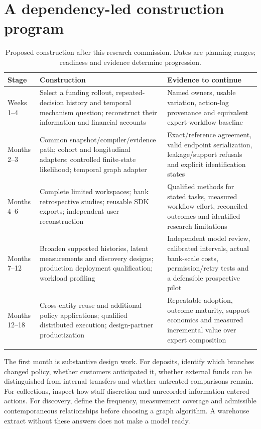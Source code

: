 \section{A dependency-led construction program}
\begin{longtable}{P{24mm}P{57mm}P{61mm}}
\toprule Stage & Construction & Evidence to continue\\\midrule\endhead
Weeks 1--4 & Select a funding rollout, repeated-decision history and temporal
mechanism question; reconstruct their information and financial accounts &
Named owners, usable variation, action-log provenance and equivalent
expert-workflow baseline\\
Months 2--3 & Common snapshot/compiler/evidence path; cohort and longitudinal
adapters; controlled finite-state likelihood; temporal graph adapter &
Exact/reference agreement, valid endpoint serialization, leakage/support
refusals and explicit identification states\\
Months 4--6 & Complete limited workspaces; bank retrospective studies;
reusable SDK exports; independent user reconstruction & Qualified methods
for stated tasks, measured workflow effort, reconciled outcomes and
identified research limitations\\
Months 7--12 & Broaden supported histories, latent measurements and
discovery designs; production deployment qualification; workload profiling &
Independent model review, calibrated intervals, actual bank-scale costs,
permission/retry tests and a defensible prospective pilot\\
Months 12--18 & Cross-entity reuse and additional policy applications;
qualified distributed execution; design-partner productization &
Repeatable adoption, outcome maturity, support economics and measured
incremental value over expert composition\\
\bottomrule
\caption{Proposed construction after this research commission. Dates are
planning ranges; readiness and evidence determine progression.}
\label{tab:roadmap}
\end{longtable}

The first month is substantive design work. For deposits, identify which
branches changed policy, whether customers anticipated it, whether external
funds can be distinguished from internal transfers and whether untreated
comparisons remain. For collections, inspect how staff discretion and
unrecorded information entered actions. For discovery, define the frequency,
measurement coverage and admissible contemporaneous relationships before
choosing a graph algorithm. A warehouse extract without these answers does
not make a model ready.

